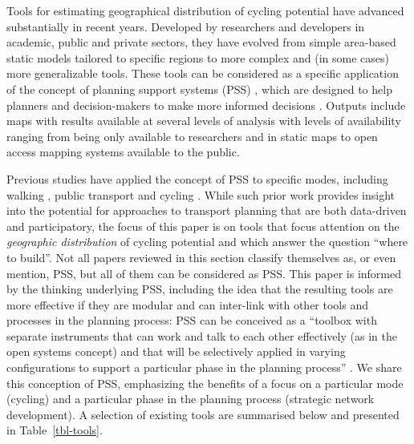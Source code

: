 \documentclass[
  super,
  preprint,
  3p]{elsarticle}
\begin{document}
Tools for estimating geographical distribution of cycling potential have
advanced substantially in recent years. Developed by researchers and
developers in academic, public and private sectors, they have evolved
from simple area-based static models tailored to specific regions to
more complex and (in some cases) more generalizable tools. These tools
can be considered as a specific application of the concept of planning
support systems (PSS) , which are designed to help planners and
decision-makers to make more informed decisions \citep{geertman2009}.
Outputs include maps with results available at several levels of
analysis with levels of availability ranging from being only available
to researchers and in static maps to open access mapping systems
available to the public.

Previous studies have applied the concept of PSS to specific modes,
including walking \citep{bencekri2024}, public transport
\citep{barmentlo2012} and cycling \citep{bencekri2023}. While such prior
work provides insight into the potential for approaches to transport
planning that are both data-driven and participatory, the focus of this
paper is on tools that focus attention on the \emph{geographic
distribution} of cycling potential and which answer the question ``where
to build''. Not all papers reviewed in this section classify themselves
as, or even mention, PSS, but all of them can be considered as PSS. This
paper is informed by the thinking underlying PSS, including the idea
that the resulting tools are more effective if they are modular and can
inter-link with other tools and processes in the planning process: PSS
can be conceived as a ``toolbox with separate instruments that can work
and talk to each other effectively (as in the open systems concept) and
that will be selectively applied in varying configurations to support a
particular phase in the planning process'' \citep{geertman2002}. We
share this conception of PSS, emphasizing the benefits of a focus on a
particular mode (cycling) and a particular phase in the planning process
(strategic network development). A selection of existing tools are
summarised below and presented in Table~\ref{tbl-tools}.

\newpage
\end{document}
